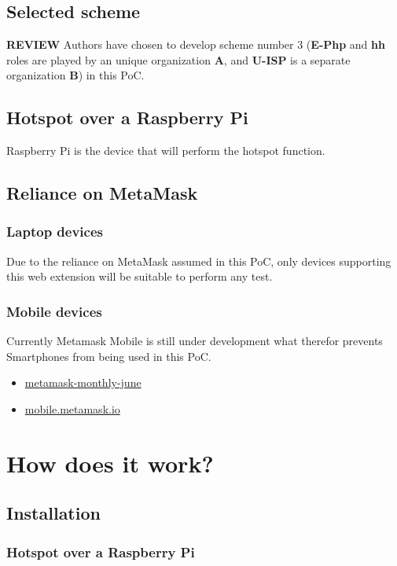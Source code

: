 \documentclass[12pt]{report}
\begin{document}
  \subsection{Selected scheme}
  \textbf{REVIEW}
  Authors have chosen to develop scheme number 3 (\textbf{E-Php} and \textbf{hh} roles are played by an unique organization \textbf{A}, and \textbf{U-ISP} is a separate organization \textbf{B}) in this PoC.

  \subsection{Hotspot over a Raspberry Pi}

  Raspberry Pi is the device that will perform the hotspot function.

  \subsection{Reliance on MetaMask}
  \subsubsection{Laptop devices}
  Due to the reliance on MetaMask assumed in this PoC, only devices supporting this web extension will be suitable to perform any test.

  \subsubsection{Mobile devices}

  Currently Metamask Mobile is still under development what therefor prevents Smartphones from being used in this PoC.

  \begin{itemize}
    \item \href{https://medium.com/metamask/metamask-monthly-june-2dddbb6618a3}{metamask-monthly-june}
    \item \href{http://mobile.metamask.io/}{mobile.metamask.io}
  \end{itemize}

  \section{How does it work?}
  \subsection{Installation}

  \subsubsection{Hotspot over a Raspberry Pi}
\end{document}
